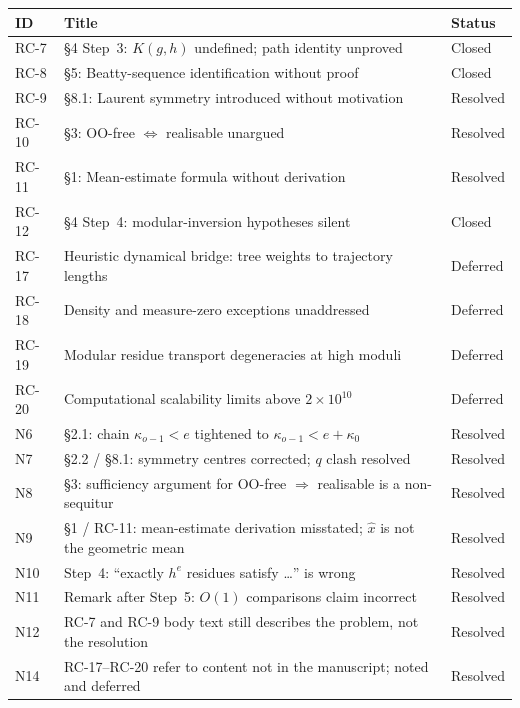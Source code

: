 \documentclass[12pt]{article}
\theoremstyle{definition}
\theoremstyle{remark}
\theoremstyle{plain}
\begin{document}
\medskip
\noindent
\begin{tabular}{@{}lll@{}}
\toprule
ID & Title & Status \\
\midrule
RC-7  & \S4 Step~3: $K(g,h)$ undefined; path identity unproved     & Closed \\
RC-8  & \S5: Beatty-sequence identification without proof           & Closed \\
RC-9  & \S8.1: Laurent symmetry introduced without motivation       & Resolved \\
RC-10 & \S3: OO-free $\Leftrightarrow$ realisable unargued          & Resolved \\
RC-11 & \S1: Mean-estimate formula without derivation               & Resolved \\
RC-12 & \S4 Step~4: modular-inversion hypotheses silent             & Closed \\
RC-17 & Heuristic dynamical bridge: tree weights to trajectory lengths & Deferred \\
RC-18 & Density and measure-zero exceptions unaddressed             & Deferred \\
RC-19 & Modular residue transport degeneracies at high moduli       & Deferred \\
RC-20 & Computational scalability limits above $2\times10^{10}$    & Deferred \\
N6    & \S2.1: chain $\kappa_{o-1} < e$ tightened to $\kappa_{o-1} < e + \kappa_0$ & Resolved \\
N7    & \S2.2 / \S8.1: symmetry centres corrected; $q$ clash resolved & Resolved \\
N8    & \S3: sufficiency argument for OO-free $\Rightarrow$ realisable is a non-sequitur & Resolved \\
N9    & \S1 / RC-11: mean-estimate derivation misstated; $\hat{x}$ is not the geometric mean & Resolved \\
N10   & Step~4: ``exactly $h^e$ residues satisfy \ldots'' is wrong  & Resolved \\
N11   & Remark after Step~5: $O(1)$ comparisons claim incorrect     & Resolved \\
N12   & RC-7 and RC-9 body text still describes the problem, not the resolution & Resolved \\
N14   & RC-17--RC-20 refer to content not in the manuscript; noted and deferred & Resolved \\
\bottomrule
\end{tabular}

\bigskip
\end{document}
